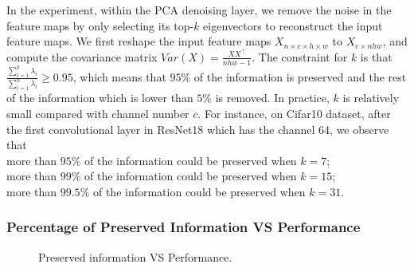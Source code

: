 In the experiment, within the PCA denoising layer, we remove the noise in the feature maps by only selecting its top-$k$ eigenvectors to reconstruct the input feature maps.
We first reshape the input feature maps $X_{n {\times} c {\times} h {\times} w}$ to $X_{c {\times} nhw}$, and compute the covariance matrix $Var(X) =\frac{XX^{\top}}{nhw-1}$.
The constraint for $k$ is that $\frac{\sum_{i=1}^k\lambda_i}{\sum_{i=1}^n\lambda_i} \geq 0.95$, which means that $95\%$ of the information is preserved and the rest of the information which is lower than $5\%$ is removed. 
In practice, $k$ is relatively small compared with channel number $c$. For instance, on Cifar10 dataset, after the first convolutional layer in ResNet18 which has the channel 64, we observe that \\
more than $95\%$ of the information could be preserved when $k=7$; \\
more than $99\%$ of the information could be preserved when $k=15$; \\
more than $99.5\%$ of the information could be preserved when $k=31$. 

\subsubsection{Percentage of Preserved Information VS Performance}

\begin{figure}[!htb]
\begin{floatrow}
{%
  \caption{Preserved information VS Performance.}%
}
\end{floatrow}
\end{figure}

